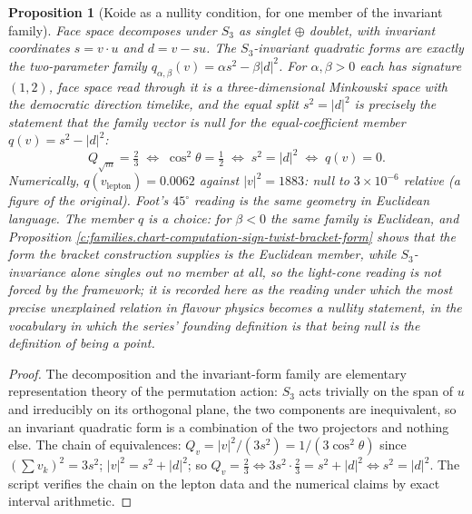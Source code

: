 \documentclass[11pt]{article}
\newtheorem{proposition}[theorem]{Proposition}
\theoremstyle{definition}
\theoremstyle{plain}
\begin{document}
\begin{proposition}[Koide as a nullity condition, for one member of the invariant family]\label{c:families.koide-nullity-condition-one-member-invariant}
Face space decomposes under $S_{3}$ as singlet $\oplus$ doublet, with invariant coordinates $s = v \cdot u$ and $d = v - su$. The $S_{3}$-invariant quadratic forms are exactly the two-parameter family $q_{\alpha,\beta}(v) = \alpha s^{2} - \beta|d|^{2}$. For $\alpha, \beta > 0$ each has signature $(1, 2)$, face space read through it is a three-dimensional Minkowski space with the democratic direction timelike, and the equal split $s^{2} = |d|^{2}$ is precisely the statement that the family vector is \emph{null} for the equal-coefficient member $q(v) = s^{2} - |d|^{2}$:
\[
Q_{\sqrt{m}} = \tfrac23 \;\iff\; \cos^{2}\theta = \tfrac12 \;\iff\; s^{2} = |d|^{2} \;\iff\; q(v) = 0 .
\]
Numerically, $q(v_{\mathrm{lepton}}) = 0.0062$ against $|v|^{2} = 1883$: null to $3 \times 10^{-6}$ relative (a figure of the original). Foot's $45^{\circ}$ reading \cite{Foot1994} is the same geometry in Euclidean language. The member $q$ is a choice: for $\beta < 0$ the same family is Euclidean, and Proposition \ref{c:families.chart-computation-sign-twist-bracket-form} shows that the form the bracket construction supplies is the Euclidean member, while $S_{3}$-invariance alone singles out no member at all, so the light-cone reading is not forced by the framework; it is recorded here as the reading under which the most precise unexplained relation in flavour physics becomes a nullity statement, in the vocabulary in which the series' founding definition is that being null is the definition of being a point.
\end{proposition}
\begin{proof}
The decomposition and the invariant-form family are elementary representation theory of the permutation action: $S_{3}$ acts trivially on the span of $u$ and irreducibly on its orthogonal plane, the two components are inequivalent, so an invariant quadratic form is a combination of the two projectors and nothing else. The chain of equivalences: $Q_{v} = |v|^{2}/(3s^{2}) = 1/(3\cos^{2}\theta)$ since $(\sum v_{k})^{2} = 3s^{2}$; $|v|^{2} = s^{2} + |d|^{2}$; so $Q_{v} = \tfrac23 \iff 3s^{2} \cdot \tfrac23 = s^{2} + |d|^{2} \iff s^{2} = |d|^{2}$. The script verifies the chain on the lepton data and the numerical claims by exact interval arithmetic.

\end{proof}
\end{document}

